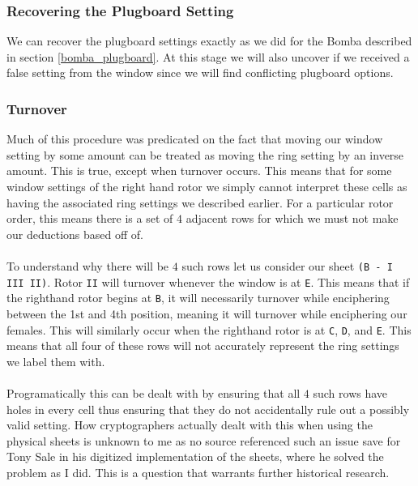 \subsubsection{Recovering the Plugboard Setting}
We can recover the plugboard settings exactly as we did for the Bomba
described in section \ref{bomba_plugboard}. At this stage we will
also uncover if we received a false setting from the window since we
will find conflicting plugboard options.

\subsubsection{Turnover}
Much of this procedure was predicated on the fact that moving our
window setting by some amount can be treated as moving the ring
setting by an inverse amount. This is true, except when turnover
occurs. This means that for some window settings of the right hand
rotor we simply cannot interpret these cells as having the associated
ring settings we described earlier. For a particular rotor order,
this means there is a set of $4$ adjacent rows for which we must not
make our deductions based off of.\\\\To understand why there will be
$4$ such rows let us consider our sheet \texttt{(B - I III II)}.
Rotor \texttt{II} will turnover whenever the window is at \texttt{E}.
This means that if the righthand rotor begins at \texttt{B}, it will
necessarily turnover while enciphering between the 1st and 4th
position, meaning it will turnover while enciphering our females.
This will similarly occur when the righthand rotor is at \texttt{C},
\texttt{D}, and \texttt{E}. This means that all four of these rows
will not accurately represent the ring settings we label them with.
\\\\Programatically this can be dealt with by ensuring that all $4$
such rows have holes in every cell thus ensuring that they do not
accidentally rule out a possibly valid setting. How cryptographers
actually dealt with this when using the physical sheets is unknown to
me as no source referenced such an issue save for Tony Sale in his
digitized implementation of the sheets, where he solved the problem
as I did. This is a question that warrants further historical research.

